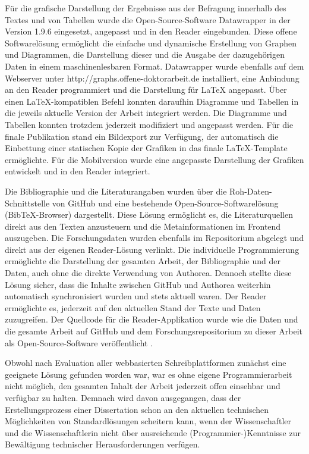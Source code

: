 Für die grafische Darstellung der Ergebnisse aus der Befragung innerhalb des Textes und von Tabellen wurde die Open-Source-Software Datawrapper \cite{datawrapper_2015} in der Version 1.9.6 eingesetzt, angepasst und in den Reader eingebunden. Diese offene Softwarelösung ermöglicht die einfache und dynamische Erstellung von Graphen und Diagrammen, die Darstellung dieser und die Ausgabe der dazugehörigen Daten in einem maschinenlesbaren Format. Datawrapper wurde ebenfalls auf dem Webserver unter http://graphs.offene-doktorarbeit.de installiert, eine Anbindung an den Reader programmiert und die Darstellung für LaTeX angepasst. Über einen LaTeX-kompatiblen Befehl konnten daraufhin Diagramme und Tabellen in die jeweils aktuelle Version der Arbeit integriert werden. Die Diagramme und Tabellen konnten trotzdem jederzeit modifiziert und angepasst werden. Für die finale Publikation stand ein Bildexport zur Verfügung, der automatisch die Einbettung einer statischen Kopie der Grafiken in das finale LaTeX-Template ermöglichte. Für die Mobilversion wurde eine angepasste Darstellung der Grafiken entwickelt und in den Reader integriert.

Die Bibliographie und die Literaturangaben wurden über die Roh-Daten-Schnittstelle von GitHub und eine bestehende Open-Source-Softwarelösung (BibTeX-Browser) dargestellt. Diese Lösung ermöglicht es, die Literaturquellen direkt aus den Texten anzusteuern und die Metainformationen im Frontend auszugeben. Die Forschungsdaten wurden ebenfalls im Repositorium abgelegt und direkt aus der eigenen Reader-Lösung verlinkt. Die individuelle Programmierung ermöglichte die Darstellung der gesamten Arbeit, der Bibliographie und der Daten, auch ohne die direkte Verwendung von Authorea. Dennoch stellte diese Lösung sicher, dass die Inhalte zwischen GitHub und Authorea weiterhin automatisch synchronisiert wurden und stets aktuell waren. Der Reader ermöglichte es, jederzeit auf den aktuellen Stand der Texte und Daten zuzugreifen. Der Quellcode für die Reader-Applikation wurde wie die Daten und die gesamte Arbeit auf GitHub und dem Forschungsrepositorium zu dieser Arbeit als Open-Source-Software veröffentlicht \cite{heise_2015_reader}.

Obwohl nach Evaluation aller webbasierten Schreibplattformen zunächst eine geeignete Lösung gefunden worden war, war es ohne eigene Programmierarbeit nicht möglich, den gesamten Inhalt der Arbeit jederzeit offen einsehbar und verfügbar zu halten. Demnach wird davon ausgegangen, dass der Erstellungsprozess einer Dissertation schon an den aktuellen technischen Möglichkeiten von Standardlösungen scheitern kann, wenn der Wissenschaftler und die Wissenschaftlerin nicht über ausreichende (Programmier-)Kenntnisse zur Bewältigung technischer Herausforderungen verfügen.

